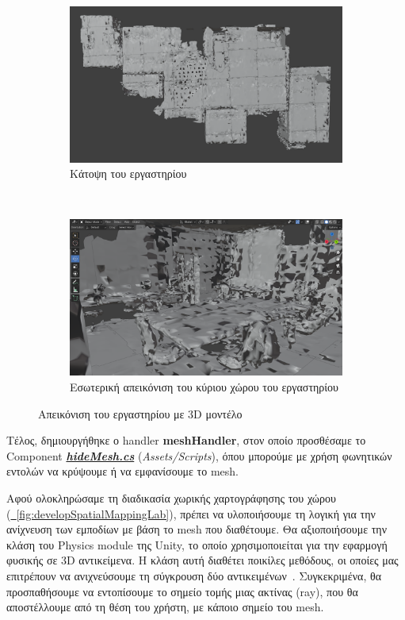 \begin{figure}[!h]
    \centering
    \begin{subfigure}{1\textwidth}
        \centering
        \includegraphics[width=0.7\linewidth]{images/develop_3DModelLabTopView.png}
        \caption{Κάτοψη του εργαστηρίου}
    \end{subfigure}%
    \\
    \begin{subfigure}{1\textwidth}
        \centering
        \includegraphics[width=0.7\linewidth]{images/develop_3DModelLabInsideView.png}
        \caption{Εσωτερική απεικόνιση του κύριου χώρου του εργαστηρίου}
    \end{subfigure}%
    \caption{Απεικόνιση του εργαστηρίου με 3D μοντέλο}\label{fig:developModelLab}
\end{figure}

Τέλος, δημιουργήθηκε ο handler \textbf{meshHandler}, στον οποίο προσθέσαμε το Component \hyperref[lst:hideMesh]{\textbf{\textit{hideMesh.cs}}} (\textit{Assets/Scripts}), όπου μπορούμε με χρήση φωνητικών εντολών να κρύψουμε ή να εμφανίσουμε το mesh.

Αφού ολοκληρώσαμε τη διαδικασία χωρικής χαρτογράφησης του χώρου (\hyperref[fig:developSpatialMappingLab]{\schema~\ref*{fig:developSpatialMappingLab}}), πρέπει να υλοποιήσουμε τη λογική για την ανίχνευση των εμποδίων με βάση το mesh που διαθέτουμε. Θα αξιοποιήσουμε την κλάση  του Physics module της Unity, το οποίο χρησιμοποιείται για την εφαρμογή φυσικής σε 3D αντικείμενα. Η κλάση αυτή διαθέτει ποικίλες μεθόδους, οι οποίες μας επιτρέπουν να ανιχνεύσουμε τη σύγκρουση δύο αντικειμένων~\cite{unitytechnologies_physics}. Συγκεκριμένα, θα προσπαθήσουμε να εντοπίσουμε το σημείο τομής μιας ακτίνας (ray), που θα αποστέλλουμε από τη θέση του χρήστη, με κάποιο σημείο του mesh.

